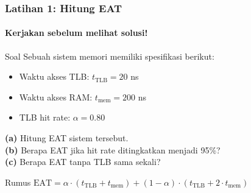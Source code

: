 \documentclass[t,aspectratio=169,xcolor=dvipsnames]{beamer}
\begin{document}
\begin{frame}
    \frametitle{Latihan 1: Hitung EAT}
    \framesubtitle{Kerjakan sebelum melihat solusi!}
    \footnotesize

    \begin{block}{Soal}
        Sebuah sistem memori memiliki spesifikasi berikut:
        \begin{itemize}
            \item Waktu akses TLB: $t_{\text{TLB}} = 20$ ns
            \item Waktu akses RAM: $t_{\text{mem}} = 200$ ns
            \item TLB hit rate: $\alpha = 0.80$
        \end{itemize}
        \textbf{(a)} Hitung EAT sistem tersebut.\\
        \textbf{(b)} Berapa EAT jika hit rate ditingkatkan menjadi 95\%?\\
        \textbf{(c)} Berapa EAT tanpa TLB sama sekali?
    \end{block}

    \vspace{0.15cm}
    \begin{alertblock}{Rumus}
        \centering
        $\text{EAT} = \alpha \cdot (t_{\text{TLB}} + t_{\text{mem}}) + (1-\alpha) \cdot (t_{\text{TLB}} + 2 \cdot t_{\text{mem}})$
    \end{alertblock}
\end{frame}
\end{document}
